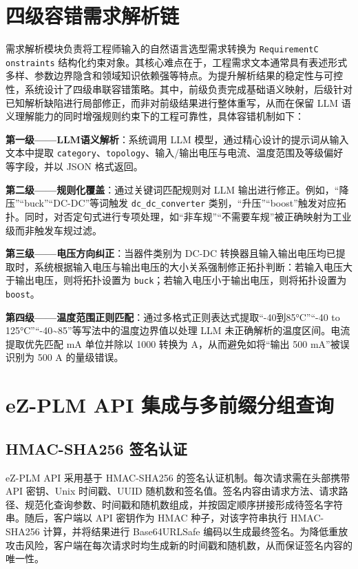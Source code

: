 
\section{四级容错需求解析链}

需求解析模块负责将工程师输入的自然语言选型需求转换为 \texttt{RequirementC\\onstraints} 结构化约束对象。其核心难点在于，工程需求文本通常具有表述形式多样、参数边界隐含和领域知识依赖强等特点。为提升解析结果的稳定性与可控性，系统设计了四级串联容错策略。其中，前级负责完成基础语义映射，后级针对已知解析缺陷进行局部修正，而非对前级结果进行整体重写，从而在保留 LLM 语义理解能力的同时增强规则约束下的工程可靠性，具体容错机制如下：

\textbf{第一级——LLM语义解析}：系统调用 LLM 模型，通过精心设计的提示词从输入文本中提取 \texttt{category}、\texttt{topology}、输入/输出电压与电流、温度范围及等级偏好等字段，并以 JSON 格式返回。

\textbf{第二级——规则化覆盖}：通过关键词匹配规则对 LLM 输出进行修正。例如，“降压”“buck”“DC-DC”等词触发 \texttt{dc\_dc\_converter} 类别，“升压”“boost”触发对应拓扑。同时，对否定句式进行专项处理，如“非车规”“不需要车规”被正确映射为工业级而非触发车规过滤。

\textbf{第三级——电压方向纠正}：当器件类别为 DC-DC 转换器且输入输出电压均已提取时，系统根据输入电压与输出电压的大小关系强制修正拓扑判断：若输入电压大于输出电压，则将拓扑设置为 \texttt{buck}；若输入电压小于输出电压，则将拓扑设置为 \texttt{boost}。

\textbf{第四级——温度范围正则匹配}：通过多格式正则表达式提取“-40到85°C”“-40 to 125°C”“-40\textasciitilde{}85”等写法中的温度边界值以处理 LLM 未正确解析的温度区间。电流提取优先匹配 mA 单位并除以 1000 转换为 A，从而避免如将“输出 500 mA”被误识别为 500 A 的量级错误。


\section{eZ-PLM API 集成与多前缀分组查询}

\subsection{HMAC-SHA256 签名认证}

eZ-PLM API 采用基于 HMAC-SHA256 的签名认证机制。每次请求需在头部携带 API 密钥、Unix 时间戳、UUID 随机数和签名值。签名内容由请求方法、请求路径、规范化查询参数、时间戳和随机数组成，并按固定顺序拼接形成待签名字符串。随后，客户端以 API 密钥作为 HMAC 种子，对该字符串执行 HMAC-SHA256 计算，并将结果进行 Base64URLSafe 编码以生成最终签名。为降低重放攻击风险，客户端在每次请求时均生成新的时间戳和随机数，从而保证签名内容的唯一性。


